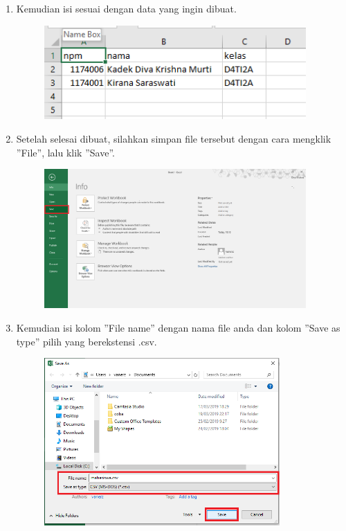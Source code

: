 \begin{enumerate}
	\item Kemudian isi sesuai dengan data yang ingin dibuat.
	
	\begin{figure}[H]
		\includegraphics[width=10cm]{figures/4/1174006/Teori/t3.png}
		\centering
	\end{figure}
	
	\item Setelah selesai dibuat, silahkan simpan file tersebut dengan cara mengklik ''File'', lalu klik ''Save''.
	
	\begin{figure}[H]
		\includegraphics[width=10cm]{figures/4/1174006/Teori/t4.png}
		\centering
	\end{figure}
	
	\item Kemudian isi kolom ''File name'' dengan nama file anda dan kolom ''Save as type'' pilih yang berekstensi .csv.
	
	\begin{figure}[H]
		\includegraphics[width=9cm]{figures/4/1174006/Teori/t5.png}
		\centering
	\end{figure}
	

\end{enumerate}
